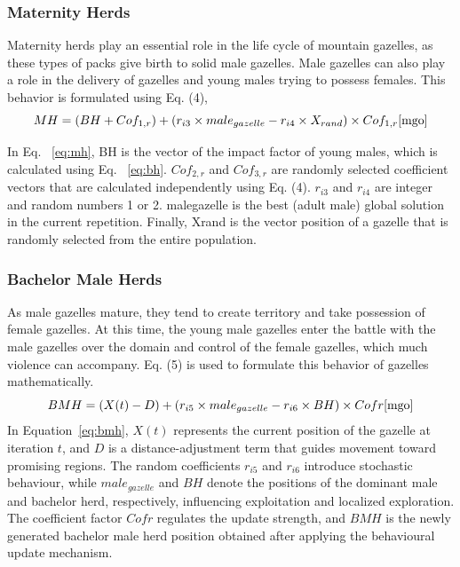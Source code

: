 \documentclass[12pt,a4paper]{article}
\begin{document}
\subsubsection{Maternity Herds}
Maternity herds play an essential role in the life cycle of mountain
gazelles, as these types of packs give birth to solid male gazelles. Male
gazelles can also play a role in the delivery of gazelles and young males
trying to possess females. This behavior is formulated using Eq. (4),
\begin{equation}
MH = \left( BH + Cof_{1,r} \right) + \left( r_{i3} \times male_{gazelle} - r_{i4} \times X_{rand} \right) \times Cof_{1,r} \cite{mgo}
\label{eq:mh}
\end{equation}

In Eq. ~\ref{eq:mh}, BH is the vector of the impact factor of young males, which
is calculated using Eq. ~\ref{eq:bh}. $Cof_{2,r}$ and $Cof_{3,r}$ are randomly selected coefficient vectors that are calculated independently using Eq. (4). $r_{i3}$ and
$r_{i4}$ are integer and random numbers 1 or 2. malegazelle is the best (adult
male) global solution in the current repetition. Finally, Xrand is the vector
position of a gazelle that is randomly selected from the entire
population. 

\subsubsection{Bachelor Male Herds}
As male gazelles mature, they tend to create territory and take
possession of female gazelles. At this time, the young male gazelles enter the battle with the male gazelles over the domain and control of the female gazelles, which much violence can accompany. Eq. (5) is used to
formulate this behavior of gazelles mathematically. 
\begin{equation}
BMH = \left( X(t) - D \right) + \left( r_{i5} \times male_{gazelle} - r_{i6} \times BH \right) \times Cofr \cite{mgo}
\label{eq:bmh}
\end{equation}
In Equation~\ref{eq:bmh}, $X(t)$ represents the current position of the gazelle at iteration $t$, and $D$ is a distance-adjustment term that guides movement toward promising regions. The random coefficients $r_{i5}$ and $r_{i6}$ introduce stochastic behaviour, while $male_{gazelle}$ and $BH$ denote the positions of the dominant male and bachelor herd, respectively, influencing exploitation and localized exploration. The coefficient factor $Cofr$ regulates the update strength, and $BMH$ is the newly generated bachelor male herd position obtained after applying the behavioural update mechanism.
\end{document}
